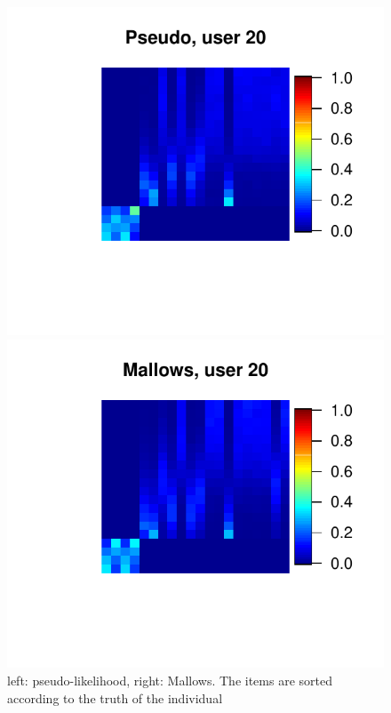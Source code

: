 \documentclass[11pt, oneside]{article}   	%
\begin{document}
\begin{figure}[hbt!]
\begin{minipage}[t]{.45\textwidth}
	\end{minipage} 
	\begin{minipage}[t]{.45\textwidth}
	\centering
	\includegraphics[width=\textwidth]{figures/clicking/pseudo_user20}
	
	\end{minipage}
	\hfill
	\begin{minipage}[t]{.45\textwidth}
		\centering
		\includegraphics[width=\textwidth]{figures/clicking/mallows_user20}
		
	\end{minipage} 

	\caption{left: pseudo-likelihood, right: Mallows. The items are sorted according to the truth of the individual}
	\label{fig:heat_ind}
\end{figure}
\end{document}
